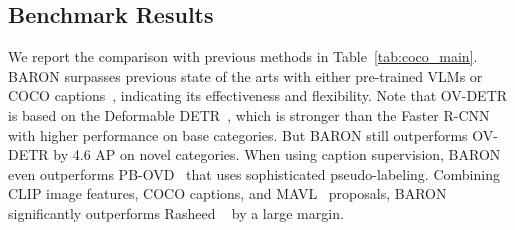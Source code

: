 \begin{table*}[t]
  \small
  \centering
\vspace{-2pt}
\caption{Comparison of the transfer ability of the model trained on OV-LVIS. * denotes the re-implemented ViLD~\cite{gu2021open} reported in DetPro~\cite{Du_2022_CVPR}.  denotes that we use hand-crafted prompts for a fair comparison with ViLD.}
\vspace{-8pt}
  { 
   }
\vspace{-10pt}
\label{tab:transfer}
\end{table*}

\subsection{Benchmark Results}
We report the comparison with previous methods in Table~\ref{tab:coco_main}.
BARON surpasses previous state of the arts with either pre-trained VLMs or COCO captions~\cite{chen2015microsoft}, indicating its effectiveness and flexibility.
Note that OV-DETR is based on the Deformable DETR~\cite{zhu2020deformable}, which is stronger than the Faster R-CNN~\cite{ren2015faster} with higher performance on base categories. 
But BARON still outperforms OV-DETR by 4.6 AP on novel categories.
When using caption supervision, BARON even outperforms PB-OVD~\cite{gao2021towards} that uses sophisticated pseudo-labeling. Combining CLIP image features, COCO captions, and MAVL~\cite{maaz2022class} proposals, BARON significantly outperforms Rasheed \etal~\cite{rasheedbridging} by a large margin.


